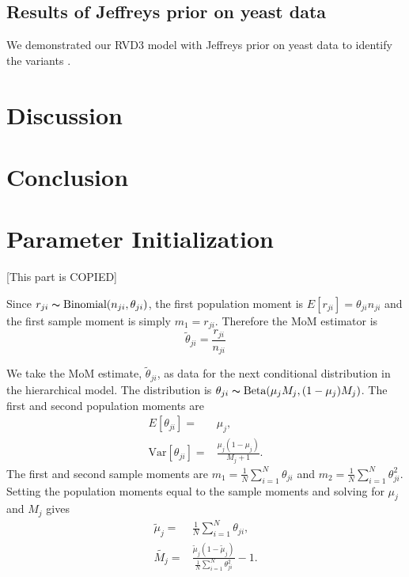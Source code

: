 \documentclass[11pt,reqno]{amsart}
\begin{document}
\subsection{Results of Jeffreys prior on yeast data}

We demonstrated our RVD3 model with Jeffreys prior on yeast data to identify the variants \citep{kvitek2013whole}.


\section{Discussion}


\section{Conclusion}


\appendix
\section{Parameter Initialization}\label{sec:appendix_mom}
[This part is COPIED]

Since $r_{ji} \thicksim \text{Binomial}(n_{ji}, \theta_{ji})$, the first population moment is  $E[r_{ji}] = \theta_{ji} n_{ji}$ and the first sample moment is simply $m_1 = r_{ji}$.
Therefore the MoM estimator is
\begin{equation}
	\tilde{\theta}_{ji} = \frac{r_{ji}} {n_{ji}}
\end{equation}

We take the MoM estimate, $\tilde{\theta}_{ji}$, as data for the next conditional distribution in the hierarchical model.
The distribution is $\theta_{ji} \thicksim \text{Beta}(\mu_jM_j, (1-\mu_j)M_j)$. The first and second population moments are
\begin{eqnarray}
	E[\theta_{ji}] =& \mu_j,\\
	\text{Var}[\theta_{ji}] =& \frac{\mu_j(1-\mu_j)} { M_j + 1 }.
\end{eqnarray}
The first and second sample moments are $m_1 = \frac{1}{N}\sum_{i=1}^N \theta_{ji}$ and $m_2 = \frac{1}{N}\sum_{i=1}^N \theta_{ji}^2$.
Setting the population moments equal to the sample moments and solving for $\mu_j$ and $M_j$ gives
\begin{eqnarray}
	\tilde{\mu}_j =& \frac{1}{N} \sum_{i=1}^N \theta_{ji}, \\
	\tilde{M_j} =& \frac{ \tilde{\mu}_j (1 - \tilde{\mu}_j ) } { \frac{1}{N} \sum_{i=1}^N \theta_{ji}^2 } -1.
\end{eqnarray}
\end{document}
